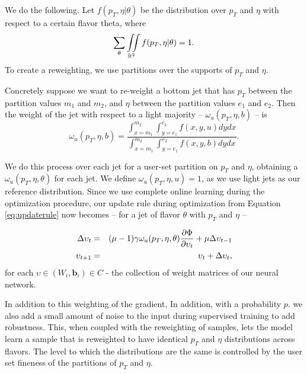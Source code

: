 We do the following. Let $f(p_T,\eta \vert \theta)$ be the distribution over $p_T$ and $\eta$ with respect to a certain flavor theta, where $$\sum_\theta \iint\limits_{\mathbb{R}^2}f(p_T,\eta | \theta) = 1.$$ To create a reweighting, we use partitions over the supports of $p_T$ and $\eta$. 

Concretely suppose we want to re-weight a bottom jet that has $p_T$ between the partition values $m_1$ and $m_2$, and $\eta$ between the partition values $e_1$ and $e_2$. Then the weight of the jet with respect to a light majority -- $\omega_u(p_T, \eta, b)$ -- is 
\begin{equation}
\omega_u(p_T, \eta, b) = \frac{\int_{x = m_1}^{m_2}\int_{y = e_1}^{e_2} f(x,y,u)dydx}{\int_{x = m_1}^{m_2}\int_{y = e_1}^{e_2} f(x,y,b)dydx}.
\end{equation}

We do this process over each jet for a user-set partition on $p_T$ and $\eta$, obtaining a $\omega_u(p_T, \eta, \theta)$ for each jet. We define $\omega_u(p_T, \eta, u) = 1$, as we use light jets as our reference distribution. Since we use complete online learning during the optimization procedure, our update rule during optimization from Equation \eqref{eq:updaterule} now becomes -- for a jet of flavor $\theta$ with $p_T$ and $\eta$ -- 

\begin{eqnarray}
\Delta\upsilon_{t} &=& (\mu - 1)\gamma\omega_u(p_T, \eta, \theta)\frac{\partial \Phi}{\partial \upsilon_t}+ \mu\Delta\upsilon_{t - 1}\\
\upsilon_{t+1} &=& \upsilon_t + \Delta\upsilon_{t},
\end{eqnarray}
for each $\upsilon\in(W_i, \mathbf{b}_i)\in C$ - the collection of weight matrices of our neural network. 

In addition to this weighting of the gradient, In addition, with a probability $p$. we also add a small amount of noise to the input during supervised training to add robustness. This, when coupled with the reweighting of samples, lets the model learn a sample that is reweighted to have identical $p_T$ and $\eta$ distributions across flavors. The level to which the distributions are the same is controlled by the user set fineness of the partitions of $p_T$ and $\eta$.













